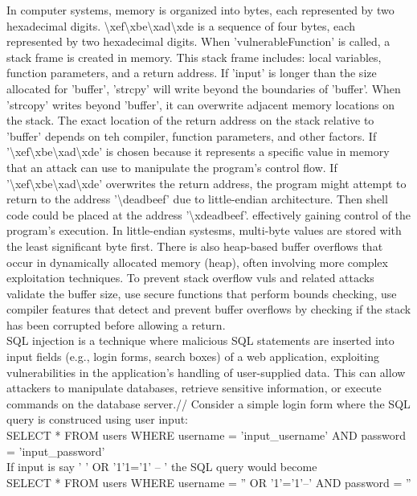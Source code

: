 \documentclass{article}
\begin{document}
\begin{itemize}
	In computer systems, memory is organized into bytes, each represented by two hexadecimal digits. \textbackslash{}xef\textbackslash{}xbe\textbackslash{}xad\textbackslash{}xde is a sequence of four bytes, each represented by two hexadecimal digits. When 'vulnerableFunction' is called, a stack frame is created in memory. This stack frame includes: local variables, function parameters, and a return address. If 'input' is longer than the size allocated for 'buffer', 'strcpy' will write beyond the boundaries of 'buffer'. When 'strcopy' writes beyond 'buffer', it can overwrite adjacent memory locations on the stack. The exact location of the return address on the stack relative to 'buffer' depends on teh compiler, function parameters, and other factors. If '\textbackslash{}xef\textbackslash{}xbe\textbackslash{}xad\textbackslash{}xde' is chosen because it represents a specific value in memory that an attack can use to manipulate the program's control flow. If '\textbackslash{}xef\textbackslash{}xbe\textbackslash{}xad\textbackslash{}xde' overwrites the return address, the program might attempt to return to the address '\textbackslash{}deadbeef' due to little-endian architecture. Then shell code could be placed at the address '\textbackslash{}xdeadbeef'. effectively gaining control of the program's execution. In little-endian systesms, multi-byte values are stored with the least significant byte first. There is also heap-based buffer overflows that occur in dynamically allocated memory (heap), often involving more complex exploitation techniques. To prevent stack overflow vuls and related attacks validate the buffer size, use secure functions that perform bounds checking, use compiler features that detect and prevent buffer overflows by checking if the stack has been corrupted before allowing a return.\\
	SQL injection is a technique where malicious SQL statements are inserted into input fields (e.g., login forms, search boxes) of a web application, exploiting vulnerabilities in the application's handling of user-supplied data. This can allow attackers to manipulate databases, retrieve sensitive information, or execute commands on the database server.//
	Consider a simple login form where the SQL query is construced using user input:\\
	SELECT * FROM users WHERE username = 'input\_username' AND password = 'input\_password'\\
	If input is say ' ' OR '1'1='1' -- '  the SQL query would become\\
	SELECT * FROM users WHERE username = '' OR '1'='1'--' AND password = ''\\

\end{itemize}
\end{document}
